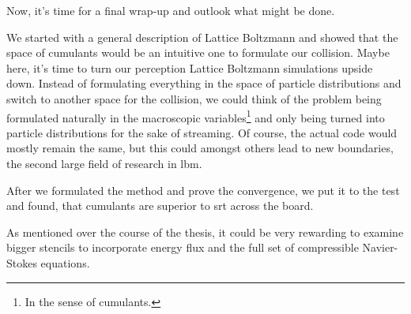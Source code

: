
Now, it's time for a final wrap-up and outlook what might be done.

We started with a general description of Lattice Boltzmann and showed that the space of cumulants would be an intuitive one to formulate our collision.
Maybe here, it's time to turn our perception Lattice Boltzmann simulations upside down.
Instead of formulating everything in the space of particle distributions and switch to another space for the collision, we could think of the problem being formulated naturally in the macroscopic variables\footnote{In the sense of cumulants.} and only being turned into particle distributions for the sake of streaming.
Of course, the actual code would mostly remain the same, but this could amongst others lead to new boundaries, the second large field of research in \gls{lbm}.

After we formulated the method and prove the convergence, we put it to the test and found, that cumulants are superior to \gls{srt} across the board.

As mentioned over the course of the thesis, it could be very rewarding to examine bigger stencils to incorporate energy flux and the full set of compressible Navier-Stokes equations.
